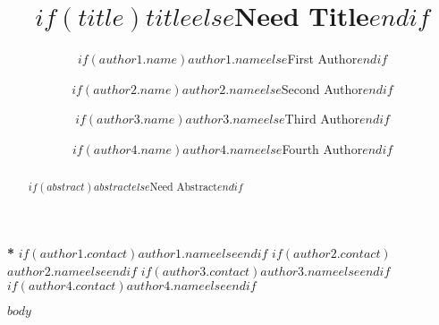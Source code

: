 \documentclass[12pt]{spieman}  %
\title{$if(title)$$title$$else$Need Title$endif$}
\author[$if(author1.affiliation)$$author1.affiliation$$endif$]{$if(author1.name)$$author1.name$$else$First Author$endif$}
\author[$if(author2.affiliation)$$author2.affiliation$$endif$]{$if(author2.name)$$author2.name$$else$Second Author$endif$}
\author[$if(author3.affiliation)$$author3.affiliation$$endif$]{$if(author3.name)$$author3.name$$else$Third Author$endif$}
\author[$if(author4.affiliation)$$author4.affiliation$$endif$]{$if(author4.name)$$author4.name$$else$Fourth Author$endif$}
\affil[a]{$if(affil1)$$affil1$$else$$endif$}
\affil[b]{$if(affil2)$$affil2$$else$$endif$}
\affil[c]{$if(affil3)$$affil3$$else$$endif$}
\affil[d]{$if(affil4)$$affil4$$else$$endif$}
\begin{document}
 
\maketitle

\begin{abstract}
$if(abstract)$$abstract$$else$Need Abstract$endif$
\end{abstract}


{\noindent \footnotesize\textbf{*}
$if(author1.contact)$$author1.name$$else$$endif$
$if(author2.contact)$$author2.name$$else$$endif$
$if(author3.contact)$$author3.name$$else$$endif$
$if(author4.contact)$$author4.name$$else$$endif$ }

\begin{spacing}{2}   %
$body$
\end{spacing}
\end{document}

